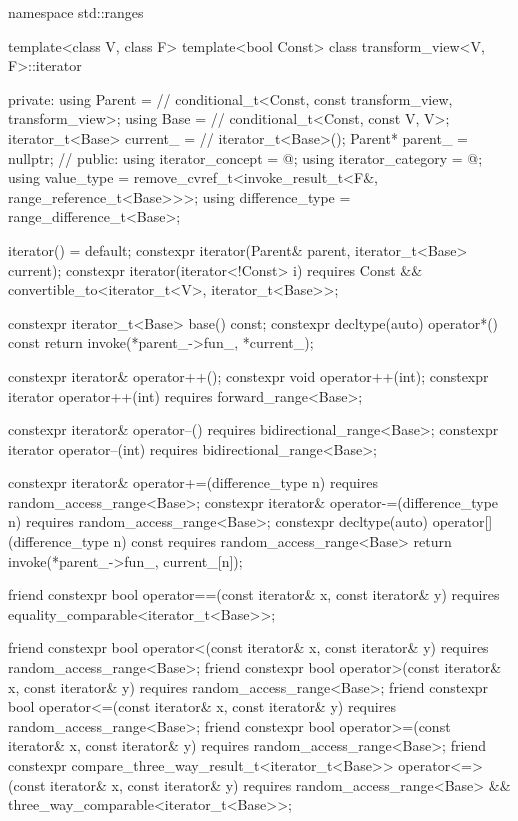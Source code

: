 %
\begin{codeblock}
namespace std::ranges {
  template<class V, class F>
  template<bool Const>
  class transform_view<V, F>::iterator {
  private:
    using Parent =                              // \expos
      conditional_t<Const, const transform_view, transform_view>;
    using Base   =                              // \expos
      conditional_t<Const, const V, V>;
    iterator_t<Base> current_ =                 // \expos
      iterator_t<Base>();
    Parent* parent_ = nullptr;                  // \expos
  public:
    using iterator_concept  = @\seebelow@;
    using iterator_category = @\seebelow@;
    using value_type        =
      remove_cvref_t<invoke_result_t<F&, range_reference_t<Base>>>;
    using difference_type   = range_difference_t<Base>;

    iterator() = default;
    constexpr iterator(Parent& parent, iterator_t<Base> current);
    constexpr iterator(iterator<!Const> i)
      requires Const && convertible_to<iterator_t<V>, iterator_t<Base>>;

    constexpr iterator_t<Base> base() const;
    constexpr decltype(auto) operator*() const
    { return invoke(*parent_->fun_, *current_); }

    constexpr iterator& operator++();
    constexpr void operator++(int);
    constexpr iterator operator++(int) requires forward_range<Base>;

    constexpr iterator& operator--() requires bidirectional_range<Base>;
    constexpr iterator operator--(int) requires bidirectional_range<Base>;

    constexpr iterator& operator+=(difference_type n)
      requires random_access_range<Base>;
    constexpr iterator& operator-=(difference_type n)
      requires random_access_range<Base>;
    constexpr decltype(auto) operator[](difference_type n) const
      requires random_access_range<Base>
    { return invoke(*parent_->fun_, current_[n]); }

    friend constexpr bool operator==(const iterator& x, const iterator& y)
      requires equality_comparable<iterator_t<Base>>;

    friend constexpr bool operator<(const iterator& x, const iterator& y)
      requires random_access_range<Base>;
    friend constexpr bool operator>(const iterator& x, const iterator& y)
      requires random_access_range<Base>;
    friend constexpr bool operator<=(const iterator& x, const iterator& y)
      requires random_access_range<Base>;
    friend constexpr bool operator>=(const iterator& x, const iterator& y)
      requires random_access_range<Base>;
    friend constexpr compare_three_way_result_t<iterator_t<Base>>
      operator<=>(const iterator& x, const iterator& y)
        requires random_access_range<Base> && three_way_comparable<iterator_t<Base>>;

}}
\end{codeblock}
